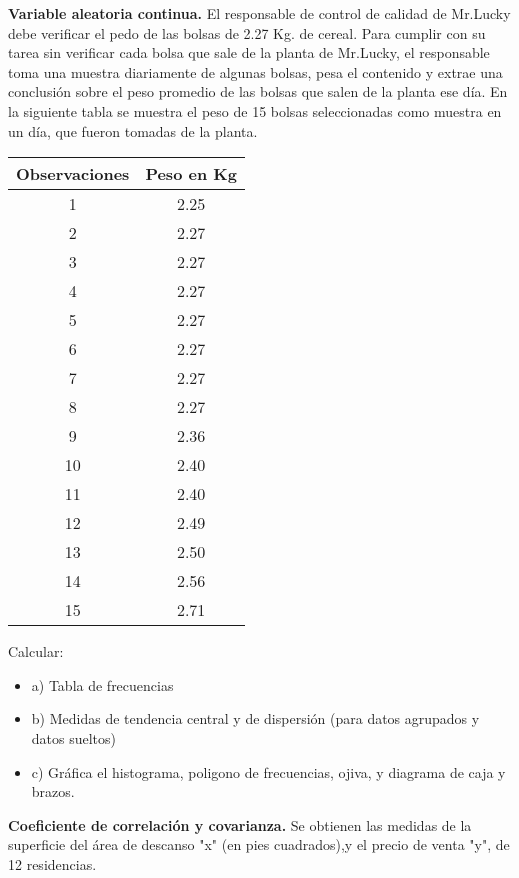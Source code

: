 \documentclass{oxmathproblems}
\begin{document}
\begin{questions}

\miquestion \textbf{Variable aleatoria continua.}
El responsable de control de calidad de Mr.Lucky debe verificar el pedo de las bolsas de 2.27 Kg. de cereal. Para cumplir con su tarea sin verificar cada bolsa que sale de la planta de Mr.Lucky, el responsable toma una muestra diariamente de algunas bolsas, pesa el contenido y extrae una conclusión sobre el peso promedio de las bolsas que salen de la planta ese día. 
En la siguiente tabla se muestra el peso de 15 bolsas seleccionadas como muestra en un día, que fueron tomadas de la planta. 
\begin{center}
\begin{tabular}{ |c|c| } 
 \hline
 \textbf{Observaciones} & \textbf{Peso en Kg} \\ 
 \hline
 1 & 2.25 \\
 2  & 2.27 \\
 3 & 2.27\\ 
 4 & 2.27 \\ 
 5 & 2.27 \\ 
 6 & 2.27 \\ 
 7 & 2.27\\ 
 8 & 2.27 \\ 
 9 & 2.36 \\ 
 10 & 2.40 \\ 
11 & 2.40 \\ 
12 & 2.49 \\
13 & 2.50 \\ 
14 & 2.56 \\ 
15 & 2.71 \\ 
 \hline
\end{tabular}
\end{center}

Calcular: 

\begin{itemize}
\item  a) Tabla de frecuencias 
\item  b) Medidas de tendencia central y de dispersión (para datos agrupados y datos sueltos)
\item c) Gráfica el histograma, poligono de frecuencias, ojiva, y  diagrama de caja y brazos. 
\end{itemize}


\miquestion \textbf{Coeficiente de correlación y covarianza. }
Se obtienen las medidas de la superficie del área de descanso "x" (en pies cuadrados),y el precio de venta "y", de 12 residencias.


\end{questions}
\end{document}
